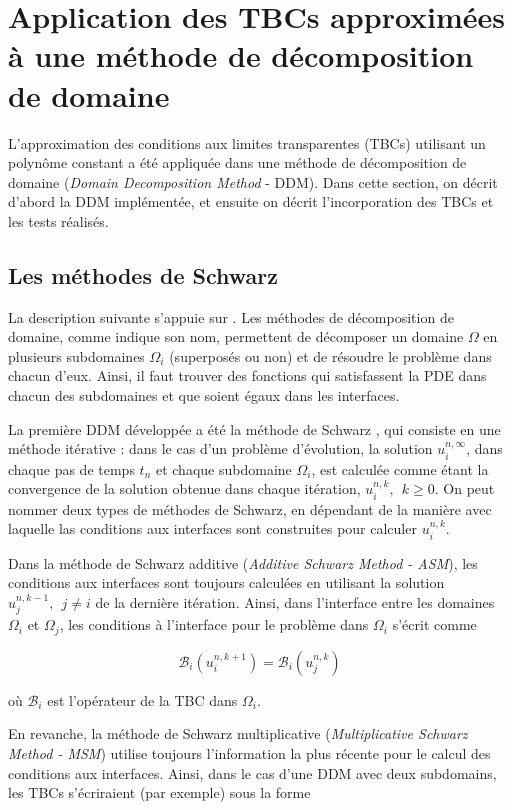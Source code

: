 \section{Application des TBCs approximées à une méthode de décomposition de domaine}
\label{sec:DDM}

\indent L'approximation des conditions aux limites transparentes (TBCs) utilisant un polynôme constant a été appliquée dans une méthode de décomposition de domaine (\emph{Domain Decomposition Method} - DDM). Dans cette section, on décrit d'abord la DDM implémentée, et ensuite on décrit l'incorporation des TBCs et les tests réalisés.

\subsection{Les méthodes de Schwarz}

\indent La description suivante s’appuie sur \cite{Japhet2003}. Les méthodes de décomposition de domaine, comme indique son nom, permettent de décomposer un domaine $\Omega$ en plusieurs subdomaines $\Omega_i$ (superposés ou non) et de résoudre le problème dans chacun d'eux. Ainsi, il faut trouver des fonctions qui satisfassent la PDE dans chacun des subdomaines et que soient égaux dans les interfaces.

\indent La première DDM développée a été la méthode de Schwarz \cite{Japhet2003,Gander2008}, qui consiste en une méthode itérative : dans le cas d'un problème d'évolution, la solution $u_i^{n,\infty}$, dans chaque pas de temps $t_n$ et chaque subdomaine $\Omega_i$, est calculée comme étant la convergence de la solution obtenue dans chaque itération, $u_i^{n,k}, \ \ k\geq 0$. On peut nommer deux types de méthodes de Schwarz, en dépendant de la manière avec laquelle las conditions aux interfaces sont construites pour calculer $u_i^{n,k}$.

\indent Dans la méthode de Schwarz additive (\emph{Additive Schwarz Method - ASM}), les conditions aux interfaces sont toujours calculées en utilisant la solution $u_j^{n,k-1}, \ \ j \neq i$ de la dernière itération. Ainsi, dans l'interface entre les domaines $\Omega_i$ et $\Omega_j$, les conditions à l'interface pour le problème dans $\Omega_i$ s'écrit comme

$$\mathcal{B}_i(u_i^{n,k+1}) = \mathcal{B}_i(u_j^{n,k})$$

\noindent où $\mathcal{B}_i$ est l'opérateur de la TBC dans $\Omega_i$.

\indent En revanche, la méthode de Schwarz multiplicative (\emph{Multiplicative Schwarz Method - MSM}) utilise toujours l'information la plus récente pour le calcul des conditions aux interfaces. Ainsi, dans le cas d'une DDM avec deux subdomains, les TBCs s'écriraient (par exemple) sous la forme

